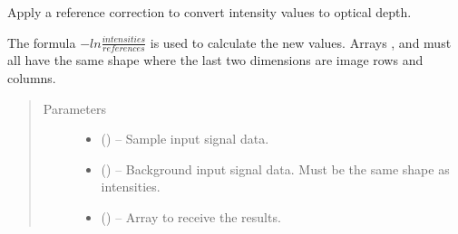 \documentclass[letterpaper,10pt,english]{sphinxmanual}
\begin{document}

\begin{fulllineitems}
\label{\detokenize{xanespy:xanespy.xanes_math.apply_references}}
Apply a reference correction to convert intensity values to optical
depth.

The formula \(-ln\frac{intensities}{references}\) is used to
calculate the new values. Arrays , 
and  must all have the same shape where the last two
dimensions are image rows and columns.
\begin{quote}\begin{description}
\item[{Parameters}] \leavevmode\begin{itemize}
\item {} 
 () -- Sample input signal data.

\item {} 
 () -- Background input signal data. Must be the same shape as
intensities.

\item {} 
 (\sphinxstyleliteralemphasis{, }) -- Array to receive the results.

\end{itemize}

\end{description}\end{quote}

\end{fulllineitems}

\end{document}
